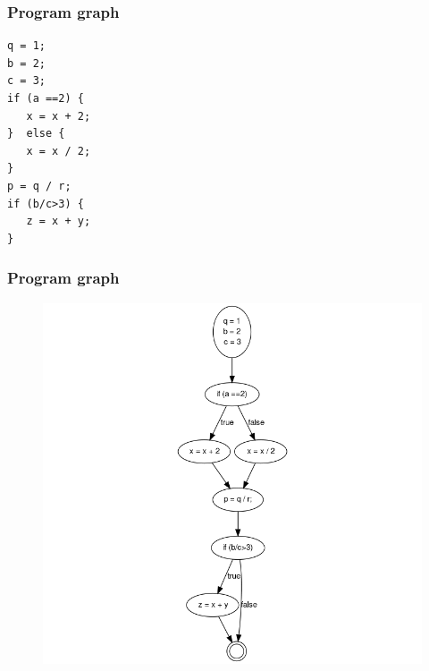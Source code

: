 \begin{frame}[hasprev=false, hasnext=true, fragile]
\label{example:program-graph}
\frametitle{Program graph}

\begin{lstlisting}
q = 1;
b = 2;
c = 3;
if (a ==2) {
   x = x + 2;
}  else {
   x = x / 2;
}
p = q / r;
if (b/c>3) {
   z = x + y;
}
\end{lstlisting}
\end{frame}


\begin{frame}[hasprev=true, hasnext=false, fragile, c]
\frametitle{Program graph}

\begin{figure}
	\centering
	\includegraphics[scale=.3]{aux/examples/program-graph/cfg-example1}
\end{figure}
\end{frame}
